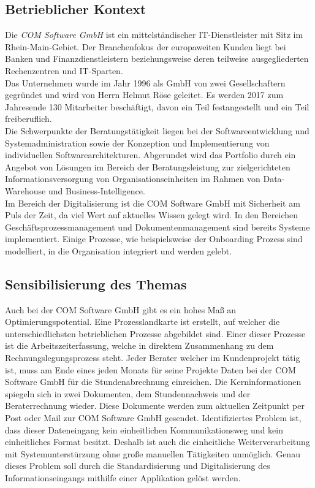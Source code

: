 \documentclass[12pt]{article}
\begin{document}
\subsection{Betrieblicher Kontext} \label{betrieb}
Die \textit{COM Software GmbH} ist ein mittelständischer IT-Dienstleister mit Sitz im Rhein-Main-Gebiet. Der Branchenfokus der europaweiten Kunden liegt bei Banken und Finanzdienstleistern beziehungsweise deren teilweise ausgegliederten Rechenzentren und IT-Sparten. \\
Das Unternehmen wurde im Jahr 1996 als GmbH von zwei Gesellschaftern gegründet und wird von Herrn Helmut Röse geleitet. Es werden 2017 zum Jahresende 130 Mitarbeiter beschäftigt, davon ein Teil festangestellt und ein Teil freiberuflich. \\
Die Schwerpunkte der Beratungstätigkeit liegen bei der Softwareentwicklung und System\-administration sowie der Konzeption und Implementierung von individuellen Softwarearchitekturen. Abgerundet wird das Portfolio durch ein Angebot von Lösungen im Bereich der Beratungsleistung zur zielgerichteten Informationsversorgung von Organisationseinheiten im Rahmen von Data-Warehouse und Business-Intelligence. \\
Im Bereich der Digitalisierung ist die COM Software GmbH mit Sicherheit am Puls der Zeit, da viel Wert auf aktuelles Wissen gelegt wird. In den Bereichen Geschäftsprozessmanagement und Dokumentenmanagement sind bereits Systeme implementiert. Einige Prozesse, wie beispielsweise der Onboarding Prozess sind modelliert, in die Organisation integriert und werden gelebt. 
\subsection{Sensibilisierung des Themas}
Auch bei der COM Software GmbH gibt es ein hohes Maß an Optimierungspotential. Eine Prozesslandkarte ist erstellt, auf welcher die unterschiedlichsten betrieblichen Prozesse abgebildet sind. Einer dieser Prozesse ist die Arbeitszeiterfassung, welche in direktem Zusammenhang zu dem Rechnungslegungsprozess steht. Jeder Berater welcher im Kundenprojekt tätig ist, muss am Ende eines jeden Monats für seine Projekte Daten bei der COM Software GmbH für die Stundenabrechnung einreichen. Die Kerninformationen spiegeln sich in zwei Dokumenten, dem Stundennachweis und der Beraterrechnung wieder. Diese Dokumente werden zum aktuellen Zeitpunkt per Post oder Mail zur COM Software GmbH gesendet. Identifiziertes Problem ist, dass dieser Dateneingang kein einheitlichen Kommunikationsweg und kein einheitliches Format besitzt. Deshalb ist auch die einheitliche Weiterverarbeitung mit Systemunterstürzung ohne große manuellen Tätigkeiten unmöglich. Genau dieses Problem soll durch die Standardisierung und Digitalisierung des Informationseingangs mithilfe einer Applikation gelöst werden.
\end{document}
